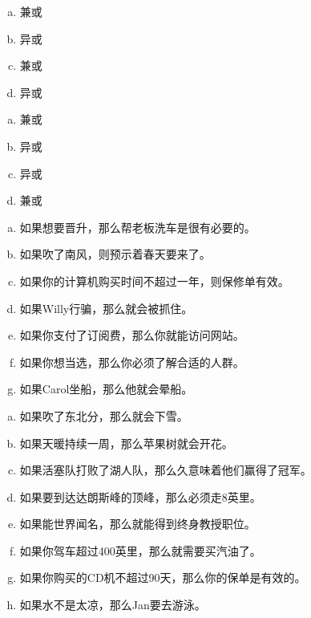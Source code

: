 {{        %
        \begin{practices}
            \begin{enumerate}[a)]
                \item 兼或
                \item 异或
                \item 兼或
                \item 异或
            \end{enumerate}
        \end{practices}

        \begin{practices}
            \begin{enumerate}[a)]
                \item 兼或
                \item 异或
                \item 异或
                \item 兼或
            \end{enumerate}
        \end{practices}

        \begin{practices}
            \begin{enumerate}[a)]
                \item 如果想要晋升，那么帮老板洗车是很有必要的。
                \item 如果吹了南风，则预示着春天要来了。
                \item 如果你的计算机购买时间不超过一年，则保修单有效。
                \item 如果Willy行骗，那么就会被抓住。
                \item 如果你支付了订阅费，那么你就能访问网站。
                \item 如果你想当选，那么你必须了解合适的人群。
                \item 如果Carol坐船，那么他就会晕船。
            \end{enumerate}
        \end{practices}

        \begin{practices}
            \begin{enumerate}[a)]
                \item 如果吹了东北分，那么就会下雪。
                \item 如果天暖持续一周，那么苹果树就会开花。
                \item 如果活塞队打败了湖人队，那么久意味着他们赢得了冠军。
                \item 如果要到达达朗斯峰的顶峰，那么必须走8英里。
                \item 如果能世界闻名，那么就能得到终身教授职位。
                \item 如果你驾车超过400英里，那么就需要买汽油了。
                \item 如果你购买的CD机不超过90天，那么你的保单是有效的。
                \item 如果水不是太凉，那么Jan要去游泳。
            \end{enumerate}
        \end{practices}

}}
